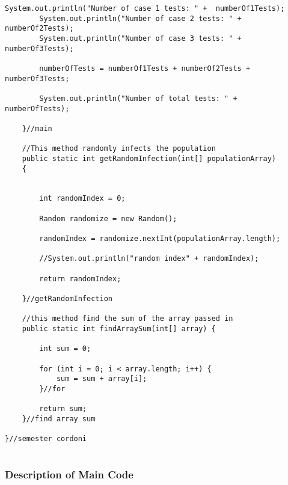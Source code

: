 \documentclass[letterpaper, 10pt,DIV=13]{scrartcl}
\numberwithin{equation}{section} %
\numberwithin{figure}{section} %
\numberwithin{table}{section} %
\begin{document}
\begin{lstlisting}[frame=single, ]
        System.out.println("Number of case 1 tests: " +  numberOf1Tests);
        System.out.println("Number of case 2 tests: " +  numberOf2Tests);
        System.out.println("Number of case 3 tests: " +  numberOf3Tests);

        numberOfTests = numberOf1Tests + numberOf2Tests + numberOf3Tests;

        System.out.println("Number of total tests: " +  numberOfTests);
        
    }//main

    //This method randomly infects the population
    public static int getRandomInfection(int[] populationArray)
    {
        

        int randomIndex = 0;

        Random randomize = new Random();

        randomIndex = randomize.nextInt(populationArray.length);

        //System.out.println("random index" + randomIndex);

        return randomIndex;
        
    }//getRandomInfection

    //this method find the sum of the array passed in
    public static int findArraySum(int[] array) {
        
        int sum = 0;

        for (int i = 0; i < array.length; i++) {
            sum = sum + array[i];
        }//for

        return sum;
    }//find array sum

}//semester cordoni
 
\end{lstlisting}

\subsubsection{Description of Main Code}
\end{document}
